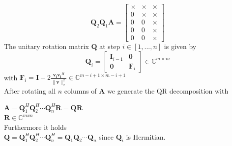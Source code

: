 \documentclass[english]{latex4ei/latex4ei_sheet}
\begin{document}
\begin{sectionbox}
    $$\mathbf{Q}_2\mathbf{Q}_1 \mathbf{A} = \begin{bmatrix}
            \times & \times & \times \\
            0      & \times & \times \\
            0      & 0      & \times \\
            0      & 0      & \times \\
            0      & 0      & \times
        \end{bmatrix}$$
    The unitary rotation matrix $\mathbf{Q}$ at step $i\in[1,...,n]$ is given by
    $$\mathbf{Q}_i = \begin{bmatrix}
            \mathbf{I}_{i-1} & \mathbf{0}   \\
            \mathbf{0}       & \mathbf{F}_i
        \end{bmatrix}\in\mathbb{C}^{m\times m}$$
    with $\mathbf{F}_i = \mathbf{I}-2\frac{\mathbf{v_i}\mathbf{v_i}^H}{\parallel \mathbf{v}\parallel_2^2} \in \mathbb{C}^{m-i+1 \times m-i+1}$\\

    After rotating all $n$ columns of $\mathbf{A}$ we generate the QR decomposition with

    $\mathbf{A} = \mathbf{Q}_1^H\mathbf{Q}_2^H\cdots\mathbf{Q}_n^H \mathbf{R} = \mathbf{Q}\mathbf{R}$\\

    $\mathbf{R} \in \mathbb{C}^{mxn}$\\
    Furthermore it holds\\
    $\mathbf{Q} = \mathbf{Q}_1^H\mathbf{Q}_2^H\cdots\mathbf{Q}_n^H = \mathbf{Q}_1\mathbf{Q}_2\cdots\mathbf{Q}_n$
    since $\mathbf{Q}_i$ is Hermitian.

\end{sectionbox}
\end{document}
